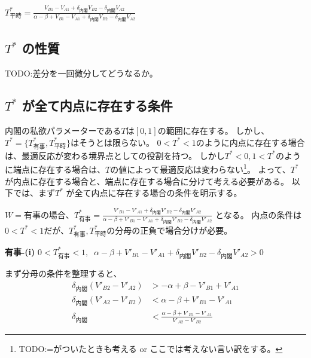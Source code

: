 \documentclass[main.tex]{subfiles}
\begin{document}
\vspace{0.5\baselineskip}

\begin{definition} \Large$T^*_{平時} = \frac{ V_{B1} - V_{A1} +\delta_{内閣}V_{B2} - \delta_{内閣}V_{A2} }{ \alpha-\beta + V_{B1}-V_{A1} + \delta_{内閣}V_{B2} - \delta_{内閣}V_{A2} }$ \end{definition}





\subsection{$T^*$ の性質}

TODO:差分を一回微分してどうなるか。






\subsection{$T^*$ が全て内点に存在する条件}

内閣の私欲パラメーターである$T$は$[0,1]$の範囲に存在する。
しかし、$T^* = \lbrace T^*_{有事}, T^*_{平時} \rbrace$はそうとは限らない。
$0<T^*<1$のように内点に存在する場合は、最適反応が変わる境界点としての役割を持つ。
しかし$T^*<0,1<T^*$のように端点に存在する場合は、$T$の値によって最適反応は変わらない\footnote{TODO:=がついたときも考える or ここでは考えない言い訳をする。}。
よって、$T^*$が内点に存在する場合と、端点に存在する場合に分けて考える必要がある。
以下では、まず$T^*$ が全て内点に存在する場合の条件を明示する。


$W=有事$の場合、$T^*_{有事} = \frac{ V'_{B1} - V'_{A1} +\delta_{内閣}V'_{B2} - \delta_{内閣}V'_{A2} }{ \alpha-\beta + V'_{B1}-V'_{A1} + \delta_{内閣}V'_{B2} - \delta_{内閣}V'_{A2} }$
となる。
内点の条件は$0<T^*<1$だが、$T^*_{有事}, T^*_{平時}$の分母の正負で場合分けが必要。

\bigskip
\noindent
\textbf{有事-(i)}\; $0<T^*_{有事}<1,\;\;\alpha-\beta + V'_{B1}-V'_{A1} + \delta_{内閣}V'_{B2} - \delta_{内閣}V'_{A2} > 0$

まず分母の条件を整理すると、
\begin{align*}
    \delta_{内閣}(V'_{B2} - V'_{A2}) &> -\alpha+\beta - V'_{B1}+V'_{A1} \\
    \delta_{内閣}(V'_{A2} - V'_{B2}) &< \alpha-\beta + V'_{B1}-V'_{A1}\\
    \delta_{内閣} &< \frac{\alpha-\beta + V'_{B1}-V'_{A1}}{V'_{A2} - V'_{B2}} 
\end{align*}
\end{document}
